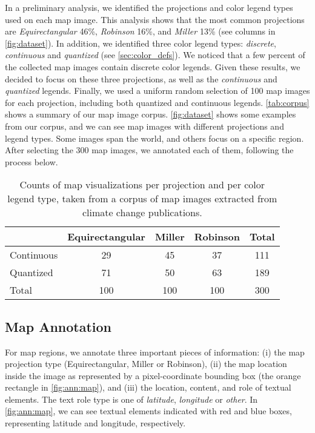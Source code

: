 In a preliminary analysis, we identified the projections and color legend types used on each map image. This analysis shows that the most common projections are \emph{Equirectangular} 46\%, \emph{Robinson} 16\%, and \emph{Miller} 13\% (see columns in \autoref{fig:dataset}). In addition, we identified three color legend types: \emph{discrete}, \emph{continuous} and \emph{quantized} (see \autoref{sec:color_defs}). We noticed that a few percent of the collected map images contain discrete color legends. Given these results, we decided to focus on these three projections, as well as the \emph{continuous} and \emph{quantized} legends. Finally, we used a uniform random selection of 100 map images for each projection, including both quantized and continuous legends. \autoref{tab:corpus} shows a summary of our map image corpus. \autoref{fig:dataset} shows some examples from our corpus, and we can see map images with different projections and legend types. Some images span the world, and others focus on a specific region.
After selecting the 300 map images, we annotated each of them, following the process below.

\begin{table}[ht]
\centering
\begin{tabular}{lcccc}
\hline
                   & Equirectangular & Miller & Robinson & Total\\
\hline
Continuous         &  29      &  45  & 37     & 111 \\
Quantized          &  71      &  50  & 63     & 189\\
\hline
Total              &  100     &  100  & 100   & 300\\
\hline
\end{tabular}
\caption[Counts of map visualizations per projection and per color legend type.]{Counts of map visualizations per projection and per color legend type, taken from a corpus of map images extracted from climate change publications.}
\label{tab:corpus}
\end{table}


\subsection{Map Annotation}
\label{subsec:mapAnnotation}
For map regions, we annotate three important pieces of information: (i) the map projection type (\ie Equirectangular, Miller or Robinson), (ii) the map location inside the image as represented by a pixel-coordinate bounding box (the orange rectangle in \autoref{fig:ann:map}), and (iii) the location, content, and role of textual elements. The text role type is one of \emph{latitude}, \emph{longitude} or \emph{other}. In \autoref{fig:ann:map}, we can see textual elements indicated with red and blue boxes, representing latitude and longitude, respectively.

